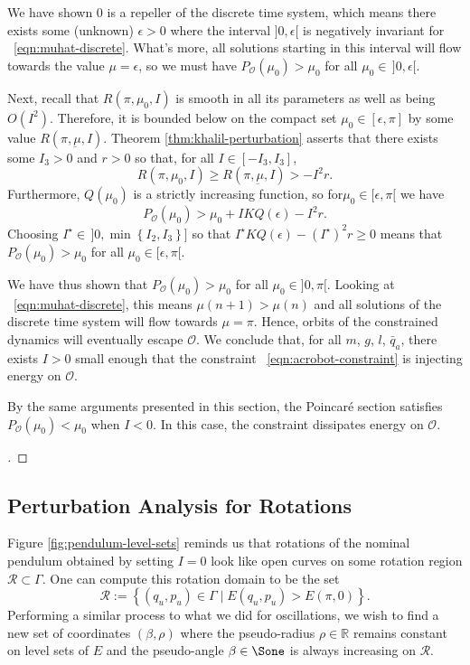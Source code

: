 We have shown \(0\) is a repeller of the discrete time system, which means
there exists some (unknown) \(\epsilon > 0\) where the interval
\(]0,\epsilon[\) is negatively invariant for ~\eqref{eqn:muhat-discrete}.
What's more, all solutions starting in this interval will flow towards the value
\(\mu = \epsilon\), so we must have \(P_\mathcal{O}(\mu_0) > \mu_0\) for all 
\(\mu_0 \in \, ]0,\epsilon[\).

Next, recall that \(R(\pi,\mu_0,I)\) is smooth in all its parameters as well as
being \(O(I^2)\).
Therefore, it is bounded below on the compact set \(\mu_0 \in [\epsilon,\pi]\)
by some value \(R(\pi,\underbar{\mu},I)\). 
Theorem \ref{thm:khalil-perturbation} asserts that there exists some
\(I_3 > 0\) and \(r > 0\) so that, for all \(I \in [-I_3, I_3]\),
\[
    R(\pi,\mu_0,I) \geq R(\pi, \underbar{\mu}, I) > -I^2 r
    .
\]
Furthermore, \(Q(\mu_0)\) is a strictly increasing function, so
for\(\mu_0 \in [\epsilon,\pi[\) we have
\[
    P_\mathcal{O}(\mu_0) > \mu_0 + I K Q(\epsilon) - I^2 r
    .
\]
Choosing \(I^\star \in\, ]0,\min\left\{I_2,I_3\right\}]\) so that
\(I^\star K Q(\epsilon) - (I^\star)^2 r \geq 0\)
means that
\( P_\mathcal{O}(\mu_0) > \mu_0\)
for all \(\mu_0 \in [\epsilon,\pi[\).

We have thus shown that \(P_\mathcal{O}(\mu_0) > \mu_0\) for all
\(\mu_0 \in ]0,\pi[\).
Looking at ~\eqref{eqn:muhat-discrete}, this means
\(\mu(n+1) > \mu(n)\) and all solutions of the discrete time system will flow
towards \(\mu = \pi\).
Hence, orbits of the constrained dynamics will eventually escape
\(\mathcal{O}\).
We conclude that, for all \(m\), \(g\), \(l\), \(\bar{q}_a\), 
there exists \(I > 0\) small enough that the constraint 
~\eqref{eqn:acrobot-constraint} is injecting energy on \(\mathcal{O}\).

By the same arguments presented in this section, the Poincar\'{e} section
satisfies \( P_\mathcal{O}(\mu_0) < \mu_0 \) when \(I < 0\). 
In this case, the constraint dissipates energy on \(\mathcal{O}\).

\begin{proof}[\unskip\nopunct]
\end{proof}

\subsection{Perturbation Analysis for Rotations}
Figure \ref{fig:pendulum-level-sets} reminds us that rotations of the 
nominal pendulum obtained by setting \(I = 0\) look like open curves on some
rotation region \(\mathcal{R} \subset \Gamma\).
One can compute this rotation domain to be the set
\[
    \mathcal{R} := \left\{ (q_u,p_u) \in \Gamma \mid E(q_u,p_u) > E(\pi,0)\right\}
    .
\]
Performing a similar process to what we did for oscillations,
we wish to find a new set of coordinates \((\beta,\rho)\)
where the pseudo-radius \(\rho \in \mathbb{R}\) remains constant on level sets
of \(E\) and the pseudo-angle \(\beta \in \Sone\) is always increasing on
\(\mathcal{R}\).

